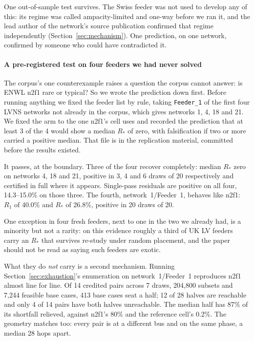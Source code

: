 \documentclass[review,authoryear,12pt]{elsarticle}
\begin{document}
One out-of-sample test survives. The Swiss feeder was not used to develop any
of this: its regime was called ampacity-limited and one-way before we ran it,
and the lead author of the network's source publication confirmed that regime
independently (Section~\ref{sec:mechanism}). One prediction, on one network,
confirmed by someone who could have contradicted it.

\paragraph{A pre-registered test on four feeders we had never solved}
The corpus's one counterexample raises a question the corpus cannot answer: is
ENWL n2f1 rare or typical? So we wrote the prediction down first. Before
running anything we fixed the feeder list by rule, taking \texttt{Feeder\_1} of
the first four LVNS networks not already in the corpus, which gives networks 1,
4, 18 and 21. We fixed the arm to the one n2f1's cell uses and recorded the
prediction
that at least 3 of the 4 would show a median $R_{\ast}$ of zero, with
falsification if two or more carried a positive median. That file is in the
replication material, committed before the results existed.

It passes, at the boundary. Three of the four recover completely: median
$R_{\ast}$ zero on networks 4, 18 and 21, positive in 3, 4 and 6 draws of 20
respectively and certified in full where it appears. Single-pass residuals are
positive on all four, 14.3--15.0\% on those three. The fourth,
network~1/Feeder~1, behaves like n2f1: $R_{1}$ of 40.0\% and $R_{\ast}$ of
26.8\%, positive in 20 draws of 20.

One exception in four fresh feeders, next to one in the two we already had, is
a minority but not a rarity: on this evidence roughly a third of UK LV feeders
carry an $R_{\ast}$ that survives re-study under random placement, and the
paper should not be read as saying such feeders are exotic.

What they do \emph{not} carry is a second mechanism. Running
Section~\ref{sec:exhaustion}'s enumeration on network~1/Feeder~1 reproduces
n2f1 almost line for line. Of 14 credited pairs across 7 draws, 204{,}800
subsets and 7{,}244 feasible base cases, 413 base cases seat a half; 12 of 28
halves are reachable and only 4 of 14 pairs have both halves unreachable. The
median half has 87\% of its shortfall relieved, against n2f1's 80\% and the
reference cell's 0.2\%. The geometry matches too: every pair is at a different
bus and on the same phase, a median 28 hops apart.
\end{document}
